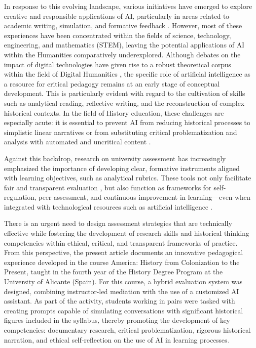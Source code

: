 \documentclass[english]{textolivre}
\begin{document}
In response to this evolving landscape, various initiatives have emerged to explore creative and responsible applications of AI, particularly in areas related to academic writing, simulation, and formative feedback \cite{bauer2025, luckin2016, topping2025}. However, most of these experiences have been concentrated within the fields of science, technology, engineering, and mathematics (STEM), leaving the potential applications of AI within the Humanities comparatively underexplored. Although debates on the impact of digital technologies have given rise to a robust theoretical corpus within the field of Digital Humanities \cite{chen2025, svensson2012, toktas2025}, the specific role of artificial intelligence as a resource for critical pedagogy remains at an early stage of conceptual development. This is particularly evident with regard to the cultivation of skills such as analytical reading, reflective writing, and the reconstruction of complex historical contexts. In the field of History education, these challenges are especially acute: it is essential to prevent AI from reducing historical processes to simplistic linear narratives or from substituting critical problematization and analysis with automated and uncritical content \cite{alvarez2023, carrasco2023, carrasco2024, kansteiner2022, tirado2023, washburn2024}.

Against this backdrop, research on university assessment has increasingly emphasized the importance of developing clear, formative instruments aligned with learning objectives, such as analytical rubrics. These tools not only facilitate fair and transparent evaluation \cite{andrade2019, nicol2006, panadero2013}, but also function as frameworks for self-regulation, peer assessment, and continuous improvement in learning—even when integrated with technological resources such as artificial intelligence \cite{kaldaras2022, martin2024}.

There is an urgent need to design assessment strategies that are technically effective while fostering the development of research skills and historical thinking competencies within ethical, critical, and transparent frameworks of practice. From this perspective, the present article documents an innovative pedagogical experience developed in the course America: History from Colonization to the Present, taught in the fourth year of the History Degree Program at the University of Alicante (Spain). For this course, a hybrid evaluation system was designed, combining instructor-led mediation with the use of a customized AI assistant. As part of the activity, students working in pairs were tasked with creating prompts capable of simulating conversations with significant historical figures included in the syllabus, thereby promoting the development of key competencies: documentary research, critical problematization, rigorous historical narration, and ethical self-reflection on the use of AI in learning processes.
\end{document}
